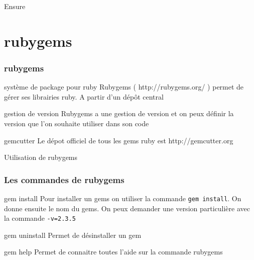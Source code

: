 \documentclass{beamer}
\begin{document}
\begin{frame}
  \begin{beamerboxesrounded}{Ensure}
    
  \end{beamerboxesrounded}
\end{frame}


\section{rubygems}

\begin{frame}
  \frametitle{rubygems}
  \begin{block}{système de package pour ruby}
    Rubygems ( http://rubygems.org/ ) permet de g\'erer
    ses librairies ruby. A partir d'un d\'epôt central
  \end{block}
  \begin{block}{gestion de version}
    Rubygems a une gestion de version et on peux d\'efinir la
    version que l'on souhaite utiliser dans son code
  \end{block}
  \begin{block}{gemcutter}
    Le d\'epot officiel de tous les gems ruby est http://gemcutter.org
  \end{block}
\end{frame}

\begin{frame}
  \begin{beamerboxesrounded}{Utilisation de rubygems}
    
  \end{beamerboxesrounded}
\end{frame}

\begin{frame}
  \frametitle{Les commandes de rubygems}
  \begin{block}{gem install}
    Pour installer un gems on utiliser la commande \verb?gem install?. On
    donne ensuite le nom du gems. On peux demander une version
    particulière avec la commande \verb?-v=2.3.5?
  \end{block}
  \begin{block}{gem uninstall}
    Permet de d\'esinstaller un gem
  \end{block}
  \begin{block}{gem help}
    Permet de connaitre toutes l'aide sur la commande rubygems
  \end{block}
\end{frame}
\end{document}
